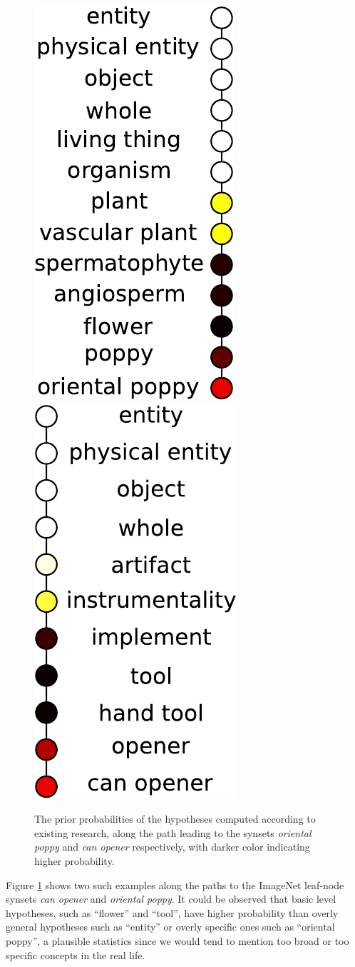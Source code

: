 \begin{figure}
    \centering
    \includegraphics[height=0.4\textwidth]{figs/taskadaptation/prior_path_poppy.pdf} \hspace{0.1in}%
    \includegraphics[height=0.4\textwidth]{figs/taskadaptation/prior_path_canopener.pdf}
    \caption{The prior probabilities of the hypotheses computed according to existing research, along the path leading to the synsets \emph{oriental poppy} and \emph{can opener} respectively, with darker color indicating higher probability.}\label{fig:conceptprior}
\end{figure}

Figure \ref{fig:conceptprior} shows two such examples along the paths to the ImageNet leaf-node synsets \emph{can opener} and \emph{oriental poppy}.  It could be observed that basic level hypotheses, such as ``flower'' and ``tool'', have higher probability than overly general hypotheses such as ``entity'' or overly specific ones such as ``oriental poppy'', a plausible statistics since we would tend to mention too broad or too specific concepts in the real life.

